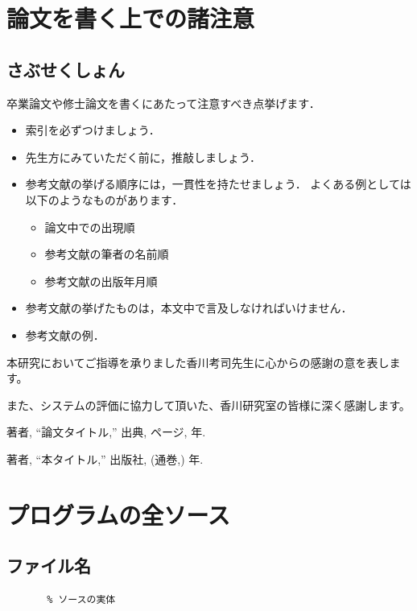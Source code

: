 \documentclass{eniepaper}
\begin{document}
   \chapter{論文を書く上での諸注意}
   \section{さぶせくしょん}
                                                          
   卒業論文や修士論文を書くにあたって注意すべき点挙げます．
   \begin{itemize}
    \item 索引を必ずつけましょう．
    \item 先生方にみていただく前に，推敲しましょう．
    \item 参考文献の挙げる順序には，一貫性を持たせましょう．
          よくある例としては以下のようなものがあります．
     \begin{itemize}
      \item 論文中での出現順
      \item 参考文献の筆者の名前順
      \item 参考文献の出版年月順
     \end{itemize}
    \item 参考文献の挙げたものは，本文中で言及しなければいけません．
    \item 参考文献の例\cite{Thesis2001}．
   \end{itemize}

\acknowledgment  %

本研究においてご指導を承りました香川考司先生に心からの感謝の意を表します。

また、システムの評価に協力して頂いた、香川研究室の皆様に深く感謝します。

\begin{thebibliography}{99} %
                                  
 著者,
 ``論文タイトル,'' 出典, ページ, 年.

 著者,
 ``本タイトル,'' 出版社, (通巻,) 年.

\end{thebibliography}

\appendix         %
  \chapter{プログラムの全ソース}

    \section{ファイル名}

    \small
    \begin{verbatim}
       % ソースの実体
    \end{verbatim}

\insertindex %
\printindex
  
\end{document}
